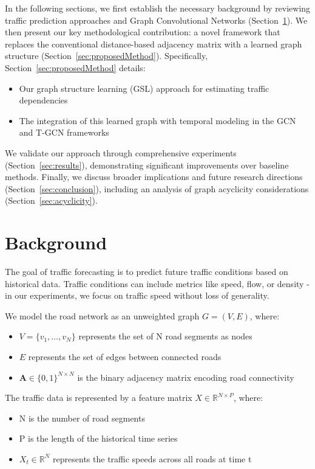 \documentclass[pdflatex,sn-mathphys-num]{sn-jnl}%
\theoremstyle{thmstyleone}%
\theoremstyle{thmstyletwo}%
\theoremstyle{thmstylethree}%
\begin{document}
In the following sections, we first establish the necessary background by reviewing traffic prediction approaches and Graph Convolutional Networks (Section~\ref{sec:bg}). We then present our key methodological contribution: a novel framework that replaces the conventional distance-based adjacency matrix with a learned graph structure (Section~\ref{sec:proposedMethod}). Specifically, Section~\ref{sec:proposedMethod} details:
\begin{itemize}
    \item Our graph structure learning (GSL) approach for estimating traffic dependencies
    \item The integration of this learned graph with temporal modeling in the GCN \citep{kipf2017semi} and T-GCN \citep{zhao2019t} frameworks
\end{itemize}

We validate our approach through comprehensive experiments (Section~\ref{sec:results}), demonstrating significant improvements over baseline methods. Finally, we discuss broader implications and future research directions (Section~\ref{sec:conclusion}), including an analysis of graph acyclicity considerations (Section~\ref{sec:acyclicity}).


\section{Background}   \label{sec:bg}
The goal of traffic forecasting is to predict future traffic conditions based on historical data. Traffic conditions can include metrics like speed, flow, or density - in our experiments, we focus on traffic speed without loss of generality.

We model the road network as an unweighted graph $G=(V,E)$, where:
\begin{itemize}
\item $V=\{v_1,\ldots,v_N\}$ represents the set of N road segments as nodes
\item $E$ represents the set of edges between connected roads
\item $\textbf{A} \in \{0,1\}^{N \times N}$ is the binary adjacency matrix encoding road connectivity
\end{itemize}

The traffic data is represented by a feature matrix $X \in \mathbb{R}^{N \times P}$, where:
\begin{itemize}
\item N is the number of road segments
\item P is the length of the historical time series
\item $X_t \in \mathbb{R}^N$ represents the traffic speeds across all roads at time t
\end{itemize}
\end{document}
